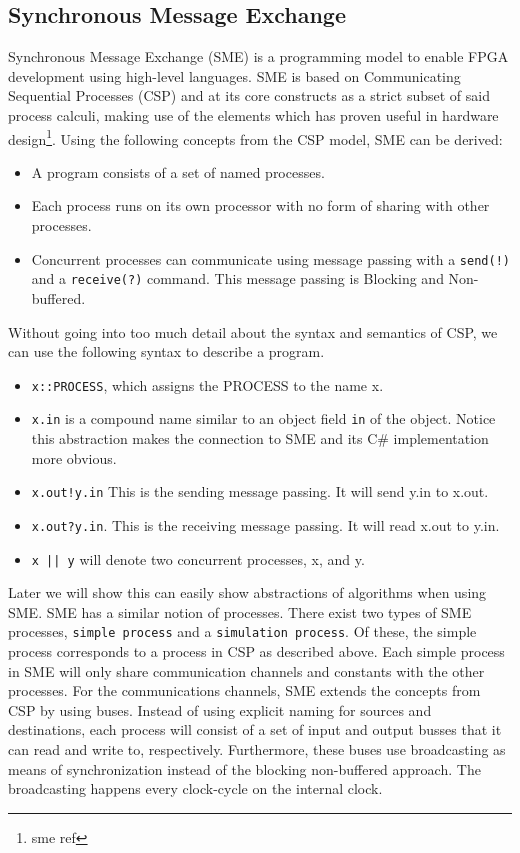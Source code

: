 \documentclass[11pt]{article}
\begin{document}
\subsection{Synchronous Message Exchange}
\label{sec:orgb2ba734}
Synchronous Message Exchange (SME) is a programming model to enable FPGA development using high-level languages. SME is based on Communicating Sequential Processes (CSP) and at its core constructs as a strict subset of said process calculi, making use of the elements which has proven useful in hardware design\cite{sme}\footnote{sme ref}. Using the following concepts from the CSP model, SME can be derived:
\begin{itemize}
\item A program consists of a set of named processes.
\item Each process runs on its own processor with no form of sharing with other processes.
\item Concurrent processes can communicate using message passing with a \texttt{send(!)} and a \texttt{receive(?)} command. This message passing is Blocking and Non-buffered.
\end{itemize}
Without going into too much detail about the syntax and semantics of CSP\cite{CSP}, we can use the following syntax to describe a program.
\begin{itemize}
\item \texttt{x::PROCESS}, which assigns the PROCESS to the name x.
\item \texttt{x.in} is a compound name similar to an object field \texttt{in} of the object. Notice this abstraction makes the connection to SME and its C\# implementation more obvious.
\item \texttt{x.out!y.in} This is the sending message passing. It will send y.in to x.out.
\item \texttt{x.out?y.in}. This is the receiving message passing. It will read x.out to y.in.
\item \texttt{x || y} will denote two concurrent processes, x, and y.
\end{itemize}
Later we will show this can easily show abstractions of algorithms when using SME. SME has a similar notion of processes. There exist two types of SME processes, \texttt{simple process} and a \texttt{simulation process}. Of these, the simple process corresponds to a process in CSP as described above. Each simple process in SME will only share communication channels and constants with the other processes. For the communications channels, SME extends the concepts from CSP by using buses. Instead of using explicit naming for sources and destinations, each process will consist of a set of input and output busses that it can read and write to, respectively. Furthermore, these buses use broadcasting as means of synchronization instead of the blocking non-buffered approach.  The broadcasting happens every clock-cycle on the internal clock.
\end{document}
